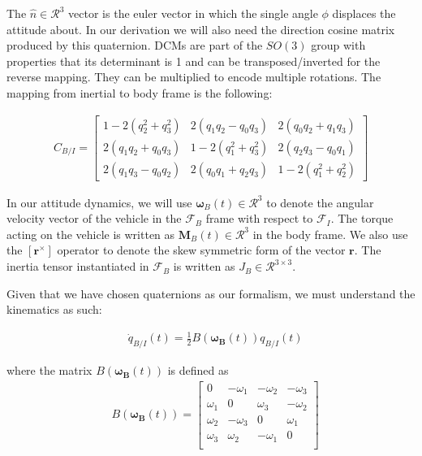 The $\hat{n} \in \mathcal{R}^3$ vector is the euler vector in which the single angle $\phi$ displaces the attitude about. In our derivation we will also need the direction cosine matrix produced by this quaternion. DCMs are part of the $SO(3)$ group with properties that its determinant is 1 and can be transposed/inverted for the reverse mapping. They can be multiplied to encode multiple rotations. The mapping from inertial to body frame is the following:

\begin{align}
C_{B/I}={\begin{bmatrix}1-2(q_{2}^{2}+q_{3}^{2})&2(q_{1}q_{2}-q_{0}q_{3})&2(q_{0}q_{2}+q_{1}q_{3})\\2(q_{1}q_{2}+q_{0}q_{3})&1-2(q_{1}^{2}+q_{3}^{2})&2(q_{2}q_{3}-q_{0}q_{1})\\2(q_{1}q_{3}-q_{0}q_{2})&2(q_{0}q_{1}+q_{2}q_{3})&1-2(q_{1}^{2}+q_{2}^{2})\end{bmatrix}}
\end{align}

In our attitude dynamics, we will use $\bm{\omega}_B(t) \in \mathcal{R}^3$ to denote the angular velocity vector of the vehicle in the $\mathcal{F}_B$ frame with respect to $\mathcal{F}_I$. The torque acting on the vehicle is written as $\mathbf{M}_B(t) \in \mathcal{R}^3$ in the body frame. We also use the $\left[\mathbf{r}^\times \right]$ operator to denote the skew symmetric form of the vector $\mathbf{r}$. The inertia tensor instantiated in $\mathcal{F}_B$ is written as $J_B \in \mathcal{R}^{3\times 3}$.

Given that we have chosen quaternions as our formalism, we must understand the kinematics as such:

\begin{align}
 & \dot{q}_{B/I}(t) = \frac{1}{2} B(\bm{\omega_B}(t)) q_{B/I}(t)
\end{align}

where the matrix $B(\bm{\omega_B}(t))$ is defined as 
\begin{align}
& B(\bm{\omega_B}(t)) = 
	\begin{bmatrix}
	0 & -\omega_1 & -\omega_2 & -\omega_3\\ 
	\omega_1 & 0 & \omega_3 & -\omega_2 \\
	\omega_2 & -\omega_3 & 0 & \omega_1 \\
	\omega_3 & \omega_2 & -\omega_1  & 0  \\
	\end{bmatrix}
\end{align}

